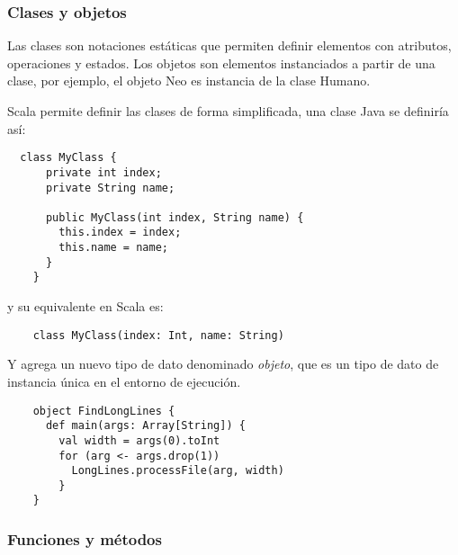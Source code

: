 
\subsubsection{Clases y objetos}

  Las clases son notaciones est\'aticas que permiten definir elementos 
  con atributos, operaciones y estados. Los objetos son elementos 
  instanciados a partir de una clase, por ejemplo, el objeto Neo es 
  instancia de la clase Humano.
  
  Scala permite definir las clases de forma simplificada, una clase
  Java se definir\'ia as\'i:

  \begin{mylisting}
  \begin{verbatim}
  class MyClass {
      private int index;
      private String name;

      public MyClass(int index, String name) {
        this.index = index;
        this.name = name;
      }
    }
  \end{verbatim}
  \end{mylisting}

  y su equivalente en Scala es:

  \begin{mylisting}
  \begin{verbatim}
    class MyClass(index: Int, name: String)
  \end{verbatim}
  \end{mylisting}

  Y agrega un nuevo tipo de dato denominado \emph{objeto}, que es 
  un tipo de dato de instancia \'unica en el entorno de ejecuci\'on.

  \begin{mylisting}
  \begin{verbatim}
    object FindLongLines {
      def main(args: Array[String]) {
        val width = args(0).toInt
        for (arg <- args.drop(1))
          LongLines.processFile(arg, width)
        }
    }
  \end{verbatim}
  \end{mylisting}

\subsubsection{Funciones y m\'etodos}

